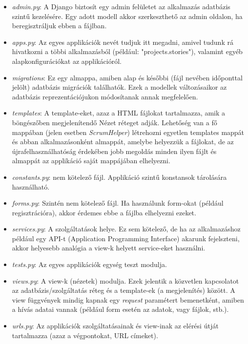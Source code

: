 \begin{itemize}
	\item \textit{admin.py}: A Django biztosít egy admin felületet az alkalmazás adatbázis szintű kezelésére. Egy adott modell akkor szerkeszthető az admin oldalon, ha beregisztráljuk ebben a fájlban.
	\item \textit{apps.py}: Az egyes applikációk nevét tudjuk itt megadni, amivel tudunk rá hivatkozni a többi alkalmazásból (például: "projects.stories"), valamint egyéb alapkonfigurációkat az applikációról.
	\item \textit{migrations}: Ez egy almappa, amiben alap és későbbi (fájl nevében időponttal jelölt) adatbázis migrációk találhatók. Ezek a modellek változásaikor az adatbázis reprezentációjukon módosítanak annak megfelelően.
	\item \textit{templates}: A template-eket, azaz a HTML fájlokat tartalmazza, amik a böngészőben megjelenítendő Nézet réteget adják. Lehetőség van a fő mappában (jelen esetben \textit{ScrumHelper}) létrehozni egyetlen templates mappát és abban alkalmazásonként almappát, amelybe helyezzük a fájlokat,   de az újrafelhasználhatóság érdekében jobb megoldás minden ilyen fájlt és almappát az applikáció saját mappájában elhelyezni.
	\item \textit{constants.py}: nem kötelező fájl. Applikáció szintű konstansok tárolására használható.
	\item \textit{forms.py}: Szintén nem kötelező fájl. Ha használunk form-okat (például regisztrációra), akkor érdemes ebbe a fájlba elhelyezni ezeket.
	\item \textit{services.py}: A szolgáltatások helye. Ez sem kötelező, de ha az alkalmazáshoz például egy API-t (Application Programming Interface) akarunk fejelszteni, akkor helyesebb analógia a view-k helyett service-eket használni.
	\item \textit{tests.py}: Az egyes applikációk egység teszt modulja.
	\item \textit{views.py}: A view-k (nézetek) modulja. Ezek jelentik a közvetlen kapcsolatot az adatbázis/szolgáltatás réteg és a template-ek (a megjelenítés) között. A view függvények mindig kapnak egy \textit{request} paramétert bemenetként, amiben a hívás adatai vannak (például form esetén az adatok, vagy fájlok, stb.).
	\item \textit{urls.py}: Az applikációk szolgáltatásainak és view-inak az elérési útját tartalmazza (azaz a végpontokat, URL címeket).
\end{itemize}

